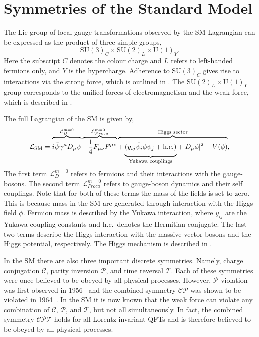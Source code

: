 \section{Symmetries of the Standard Model}
\label{sec:symmetries_of_sm}

The Lie group of local gauge transformations observed by the SM Lagrangian can be expressed as the product of three simple groups,
\begin{equation}
	\label{eq:sm_group}
	\text{SU}(3)_C \times \text{SU}(2)_L \times \text{U}(1)_Y.
\end{equation}
Here the subscript $C$ denotes the colour charge and $L$ refers to left-handed fermions only, and $Y$ is the hypercharge.
Adherence to $\text{SU}(3)_C$ gives rise to interactions via the strong force, which is outlined in .
The $\text{SU}(2)_L \times \text{U}(1)_Y$ group corresponds to the unified forces of electromagnetism and the weak force, which is described in .

The full Lagrangian of the SM is given by,
\begin{equation}
	\label{eq:sm_lagrangian}
	\mathcal{L}_\text{SM} =
	\overbrace{
		\vphantom{\frac{1}{4}}
		i \bar \psi \gamma^\mu D_\mu \psi
	}^{\mathcal{L}_{D}^{m=0}
	}
	\overbrace{
		-\frac{1}{4} F_{\mu\nu} F^{\mu\nu}
	}^{\mathcal{L}_{Proca}^{m=0}
	}
	\overbrace{
		+
		\underbrace{
			\vphantom{\frac{1}{4}}
			(y_{ij} \bar \psi_i \phi \psi_j
			+ \text{h.c.})
		}_{\text{Yukawa couplings}}
		+ |D_\mu \phi|^2
		- V(\phi)
	}^{\text{Higgs sector}},
\end{equation}
The first term $\mathcal{L}_D^{m=0}$ refers to fermions and their interactions with the gauge-bosons.
The second term $\mathcal{L}_{Proca}^{m=0}$ refers to gauge-boson dynamics and their self couplings.
Note that for both of these terms the mass of the fields is set to zero.
This is because mass in the SM are generated through interaction with the Higgs field $\phi$.
Fermion mass is described by the Yukawa interaction, where $y_{ij}$ are the Yukawa coupling constants and h.c.\ denotes the Hermitian conjugate.
The last two terms describe the Higgs interaction with the massive vector bosons and the Higgs potential, respectively.
The Higgs mechanism is described in .

In the SM there are also three important discrete symmetries.
Namely, charge conjugation $\mathcal{C}$, parity inversion $\mathcal{P}$, and time reversal $\mathcal{T}$.
Each of these symmetries were once believed to be obeyed by all physical processes.
However, $\mathcal{P}$ violation was first observed in 1956~\cite{Wu1957} and the combined symmetry $\mathcal{CP}$ was shown to be violated in 1964~\cite{CPViolation}.
In the SM it is now known that the weak force can violate any combination of $\mathcal{C}$, $\mathcal{P}$, and $\mathcal{T}$, but not all simultaneously.
In fact, the combined symmetry $\mathcal{CPT}$ holds for all Lorentz invariant QFTs and is therefore believed to be obeyed by all physical processes.

